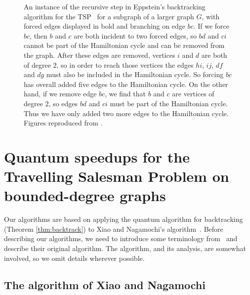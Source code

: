 \begin{figure}
\begin{center}
\end{center}
\caption[An instance of the recursive step in Eppstein's algorithm]{An instance of the recursive step in Eppstein's backtracking algorithm for the TSP~\cite{eppstein2007} for a subgraph of a larger graph $G$, with forced edges displayed in bold and  branching on edge $bc$. If we force $bc$, then $b$ and $c$ are both incident to two forced edges, so $bd$ and $ci$ cannot be part of the Hamiltonian cycle and can be removed from the graph. After these edges are removed, vertices $i$ and $d$ are both of degree $2$, so in order to reach those vertices the edges $hi$, $ij$, $df$ and $dg$ must also be included in the Hamiltonian cycle. So forcing $bc$ has overall added five edges to the Hamiltonian cycle. On the other hand, if we remove edge $bc$, we find that $b$ and $c$ are vertices of degree $2$, so edges $bd$ and $ci$ must be part of the Hamiltonian cycle. Thus we have only added two more edges to the Hamiltonian cycle. Figures reproduced from \cite{moylett2016}.
\label{fig:size-decrease-by-two}}
\end{figure}


\section{Quantum speedups for the Travelling Salesman Problem on bounded-degree graphs \label{sec:bd}}
\label{sec:deg3}

Our algorithms are based on applying the quantum algorithm for backtracking (Theorem \ref{thm:backtrack}) to Xiao and Nagamochi's algorithm~\cite{xiao2016degree3}. Before describing our algorithms, we need to introduce some terminology from~\cite{xiao2016degree3} and describe their original algorithm. The algorithm, and its analysis, are somewhat involved, so we omit details wherever possible.

\subsection{The algorithm of Xiao and Nagamochi}
\label{sec:xndeg3}

